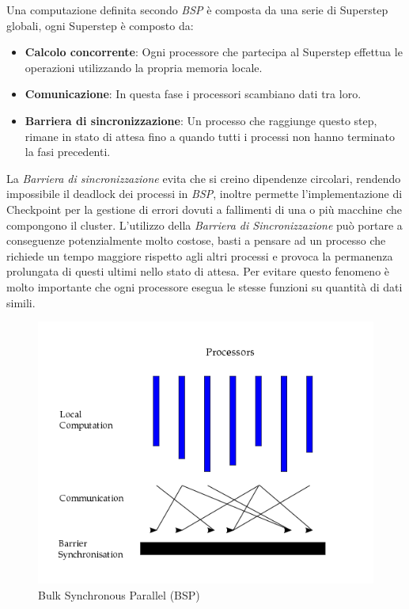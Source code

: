 \documentclass[LaM,binding=0.6cm]{sapthesis}
\begin{document}
Una computazione definita secondo \textit{BSP} è composta da una serie di Superstep globali, ogni Superstep è composto da:
\begin{itemize}
\item \textbf{Calcolo concorrente}: Ogni processore che partecipa al Superstep effettua le operazioni utilizzando la propria memoria locale.
\item \textbf{Comunicazione}: In questa fase i processori scambiano dati tra loro.
\item \textbf{Barriera di sincronizzazione}: Un processo che raggiunge questo step, rimane in stato di attesa fino a quando tutti i processi non hanno terminato la fasi precedenti.
\end{itemize}

La \textit{Barriera di sincronizzazione} evita che si creino dipendenze circolari, rendendo impossibile il deadlock dei processi in \textit{BSP}, inoltre permette l'implementazione di Checkpoint per la gestione di errori dovuti a fallimenti di una o più macchine che compongono il cluster. L'utilizzo della \textit{Barriera di Sincronizzazione} può portare a conseguenze potenzialmente molto costose, basti a pensare ad un processo che richiede un tempo maggiore rispetto agli altri processi e provoca la permanenza prolungata di questi ultimi nello stato di attesa. Per evitare questo fenomeno è molto importante che ogni processore esegua le stesse funzioni su quantità di dati simili.

\begin{figure}
\centering
\includegraphics[width=1\textwidth]{BSP}
\caption{Bulk Synchronous Parallel (BSP) \cite{1_wikipedia_2015}}
\label{fig:BSP}
\end{figure}
\end{document}
